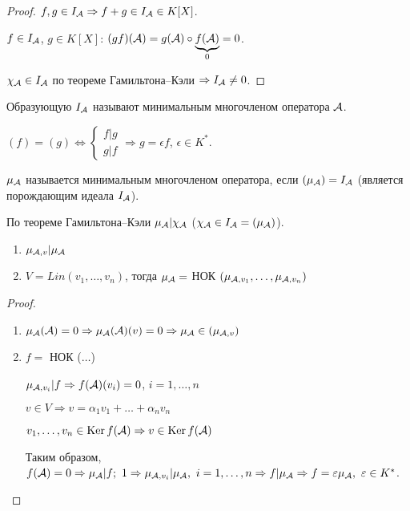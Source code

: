 \documentclass[main]{subfiles}
\begin{document}
\begin{proof}
    $f, g \in I_{\mathcal{A}} \Rightarrow f+g \in I_{\mathcal{A}} \in K[X]$.

    $f \in I_{\mathcal{A}}$, $g \in K[X]$: $(gf)(\mathcal{A}) = g(\mathcal{A}) \circ \underbrace{f(\mathcal{A})}_{0} = 0$.

    $\chi_{\mathcal{A}} \in I_{\mathcal{A}}$ по теореме Гамильтона--Кэли $\Rightarrow I_{\mathcal{A}} \neq 0$.
\end{proof}

Образующую $I_{\mathcal{A}}$ называют минимальным многочленом  оператора $\mathcal{A}$.

\begin{remark}
    $(f) = (g) \Leftrightarrow \begin{cases}
            f|g \\
            g|f
        \end{cases} \Rightarrow g = \epsilon f$, $\epsilon \in K^*$.
\end{remark}

\begin{definition} 
    $\mu_{\mathcal{A}}$ называется минимальным многочленом оператора, если $(\mu_{\mathcal{A}}) = I_{\mathcal{A}}$ (является порождающим идеала $I_{\mathcal{A}}$).
\end{definition}

По теореме Гамильтона--Кэли $\mu_{\mathcal{A}}|\chi_{\mathcal{A}}$ ($\chi_{\mathcal{A}} \in I_{\mathcal{A}} = (\mu_{\mathcal{A}})$).

\begin{proposition}
    \begin{enumerate}
        \item $\mu_{\mathcal{A}, v} | \mu_{\mathcal{A}}$
        \item $V = Lin(v_1, \ldots, v_n)$, тогда $\mu_{\mathcal{A}} = $ НОК $(\mu_{\mathcal{A}, v_1}, \ldots, \mu_{\mathcal{A}, v_n})$
    \end{enumerate}
\end{proposition}

\begin{proof}
    \begin{enumerate}
        \item $\mu_{\mathcal{A}}(\mathcal{A}) = 0 \Rightarrow \mu_{\mathcal{A}}(\mathcal{A})(v) = 0 \Rightarrow \mu_{\mathcal{A}} \in (\mu_{\mathcal{A}, v})$
        \item $f = $ НОК ($\ldots$)

              $\mu_{\mathcal{A}, v_i} | f \Rightarrow f(\mathcal{A})(v_i) = 0$, $i = 1, \ldots, n$

              $v \in V \Rightarrow v = \alpha_1 v_1 + \ldots + \alpha_n v_n$

              $v_1, \ldots, v_n \in \operatorname{Ker} f(\mathcal{A}) \Rightarrow v \in \operatorname{Ker} f(\mathcal{A})$

              Таким образом, $f(\mca) = 0 \Rightarrow \mu_{\mca}|f; \ 1 \Rightarrow \mu_{\mca, v_i}|\mu_{\mca}, \ i=1, \ldots, n \Rightarrow f|\mu_{\mca} \Rightarrow f = \epsilon \mu_{\mca}, \ \epsilon \in K^*$.
    \end{enumerate}
\end{proof}
\end{document}

